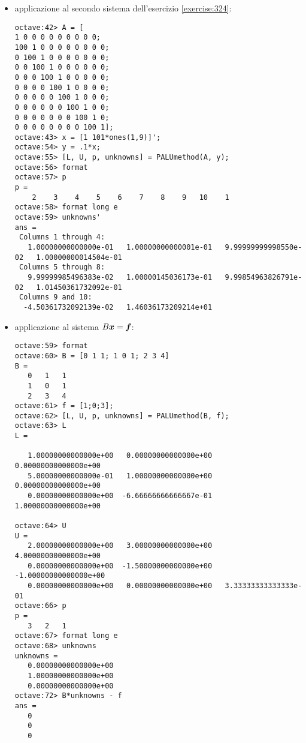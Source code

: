 \begin{itemize}
\item applicazione al secondo sistema dell'esercizio \ref{exercise:324}:
\begin{lstlisting}
octave:42> A = [ 
1 0 0 0 0 0 0 0 0 0; 
100 1 0 0 0 0 0 0 0 0; 
0 100 1 0 0 0 0 0 0 0; 
0 0 100 1 0 0 0 0 0 0; 
0 0 0 100 1 0 0 0 0 0; 
0 0 0 0 100 1 0 0 0 0; 
0 0 0 0 0 100 1 0 0 0; 
0 0 0 0 0 0 100 1 0 0; 
0 0 0 0 0 0 0 100 1 0; 
0 0 0 0 0 0 0 0 100 1];
octave:43> x = [1 101*ones(1,9)]';
octave:54> y = .1*x;
octave:55> [L, U, p, unknowns] = PALUmethod(A, y);
octave:56> format
octave:57> p
p =
    2    3    4    5    6    7    8    9   10    1
octave:58> format long e
octave:59> unknowns'
ans =
 Columns 1 through 4:
   1.00000000000000e-01   1.00000000000001e-01   9.99999999998550e-02   1.00000000014504e-01
 Columns 5 through 8:
   9.99999985496383e-02   1.00000145036173e-01   9.99854963826791e-02   1.01450361732092e-01
 Columns 9 and 10:
  -4.50361732092139e-02   1.46036173209214e+01
\end{lstlisting} 
\item applicazione al sistema $B\boldsymbol{x} = \boldsymbol{f}$:
\begin{lstlisting}
octave:59> format 
octave:60> B = [0 1 1; 1 0 1; 2 3 4]
B =
   0   1   1
   1   0   1
   2   3   4
octave:61> f = [1;0;3];
octave:62> [L, U, p, unknowns] = PALUmethod(B, f);
octave:63> L
L =

   1.00000000000000e+00   0.00000000000000e+00   0.00000000000000e+00
   5.00000000000000e-01   1.00000000000000e+00   0.00000000000000e+00
   0.00000000000000e+00  -6.66666666666667e-01   1.00000000000000e+00

octave:64> U
U =
   2.00000000000000e+00   3.00000000000000e+00   4.00000000000000e+00
   0.00000000000000e+00  -1.50000000000000e+00  -1.00000000000000e+00
   0.00000000000000e+00   0.00000000000000e+00   3.33333333333333e-01
octave:66> p
p =
   3   2   1
octave:67> format long e
octave:68> unknowns 
unknowns =
   0.00000000000000e+00
   1.00000000000000e+00
   0.00000000000000e+00
octave:72> B*unknowns - f
ans =
   0
   0
   0
\end{lstlisting}
\end{itemize}

